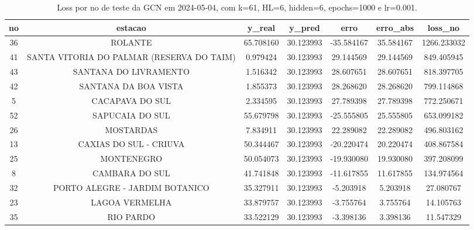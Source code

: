 \begin{table}[h]
\centering
\caption{Loss por no de teste da GCN em 2024-05-04, com k=61, HL=6, hidden=6, epochs=1000 e lr=0.001.}
\label{tab:gcn_loss_k61_hl6_h6_e1000_d20240504}
\begin{tabular}{ccccccc}
\toprule
no & estacao & y\_real & y\_pred & erro & erro\_abs & loss\_no \\
\midrule
36 & ROLANTE & 65.708160 & 30.123993 & -35.584167 & 35.584167 & 1266.233032 \\
41 & SANTA VITORIA DO PALMAR (RESERVA DO TAIM) & 0.979424 & 30.123993 & 29.144569 & 29.144569 & 849.405945 \\
43 & SANTANA DO LIVRAMENTO & 1.516342 & 30.123993 & 28.607651 & 28.607651 & 818.397705 \\
42 & SANTANA DA BOA VISTA & 1.855373 & 30.123993 & 28.268620 & 28.268620 & 799.114868 \\
5 & CACAPAVA DO SUL & 2.334595 & 30.123993 & 27.789398 & 27.789398 & 772.250671 \\
52 & SAPUCAIA DO SUL & 55.679798 & 30.123993 & -25.555805 & 25.555805 & 653.099182 \\
26 & MOSTARDAS & 7.834911 & 30.123993 & 22.289082 & 22.289082 & 496.803162 \\
13 & CAXIAS DO SUL - CRIUVA & 50.344467 & 30.123993 & -20.220474 & 20.220474 & 408.867584 \\
25 & MONTENEGRO & 50.054073 & 30.123993 & -19.930080 & 19.930080 & 397.208099 \\
8 & CAMBARA DO SUL & 41.741848 & 30.123993 & -11.617855 & 11.617855 & 134.974564 \\
32 & PORTO ALEGRE - JARDIM BOTANICO & 35.327911 & 30.123993 & -5.203918 & 5.203918 & 27.080767 \\
23 & LAGOA VERMELHA & 33.879757 & 30.123993 & -3.755764 & 3.755764 & 14.105763 \\
35 & RIO PARDO & 33.522129 & 30.123993 & -3.398136 & 3.398136 & 11.547329 \\
\bottomrule
\end{tabular}
\end{table}
